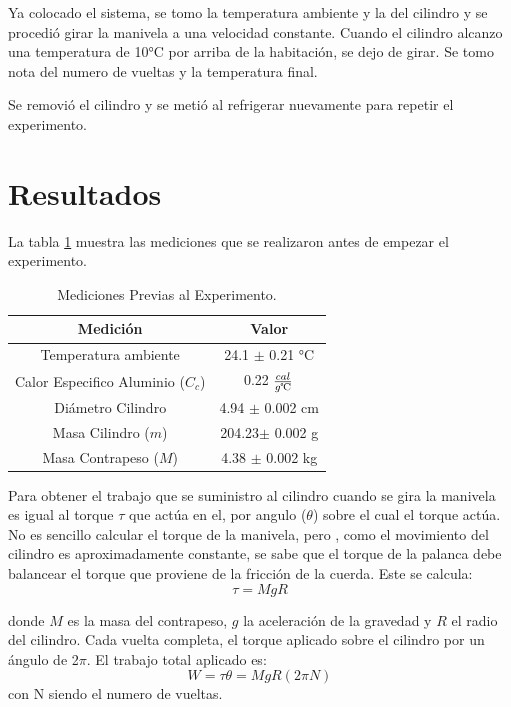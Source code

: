 \documentclass[12pt]{article}
\begin{document}
Ya colocado el sistema, se tomo la temperatura ambiente y la del cilindro y se procedió girar la manivela a una velocidad constante. Cuando el cilindro alcanzo una temperatura de 10°C por arriba de la habitación, se dejo de girar. Se tomo nota del numero de vueltas y la temperatura final.

Se removió el cilindro y se metió al refrigerar nuevamente para repetir el experimento.
\pagebreak
\section{Resultados}
La tabla \ref{tab:Med} muestra las mediciones que se realizaron antes de empezar el experimento.

	\begin{table}[H]
		\centering
		\begin{tabular}{|c|c|}
			\hline
			\textbf{Medición}				  & \textbf{Valor} 				  \\ \hline
			Temperatura ambiente 			  & 24.1 $\pm$ 0.21 °C 			  \\ \hline
			Calor Especifico Aluminio ($C_c$) & 0.22 $\frac{cal}{g\celsius}$  \\ \hline
			Diámetro Cilindro 				  & 4.94 $\pm$ 0.002 cm			  \\ \hline
			Masa Cilindro ($m$)				  & 204.23$\pm$ 0.002 g			  \\ \hline
			Masa Contrapeso ($M$)			  & 4.38 $\pm$ 0.002 kg			  \\ \hline
		\end{tabular}
		\caption{Mediciones Previas al Experimento.}
		\label{tab:Med}
	\end{table}


Para obtener el trabajo que se suministro al cilindro cuando se gira la manivela es igual al torque $\tau$ que actúa en el, por angulo ($\theta$) sobre el cual el torque actúa. No es sencillo calcular el torque de la manivela, pero , como el movimiento del cilindro es aproximadamente constante, se sabe que el torque de la palanca debe balancear el torque que proviene de la fricción de la cuerda. Este se calcula:
\begin{equation}
\label{Eq:Torque}
\tau = MgR
\end{equation}

donde $M$ es la masa del contrapeso, $g$ la aceleración de la gravedad y $R$ el radio del cilindro. Cada vuelta completa, el torque aplicado sobre el cilindro por un ángulo de 2$\pi$. El trabajo total aplicado es:
\begin{equation}
\label{Eq:Work}
W=\tau\theta = MgR(2\pi N)
\end{equation}
con N siendo el numero de vueltas.
\end{document}
